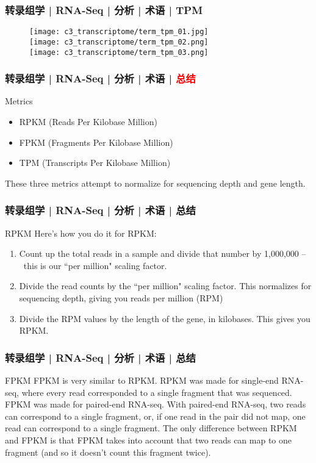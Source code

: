 \begin{frame}
  \frametitle{转录组学 | RNA-Seq | 分析 | 术语 | \alert{TPM}}
  \begin{figure}
    \centering
    \texttt{[image: c3\_transcriptome/term\_tpm\_01.jpg]}\\
    \texttt{[image: c3\_transcriptome/term\_tpm\_02.png]}\\
    \texttt{[image: c3\_transcriptome/term\_tpm\_03.png]}
  \end{figure}
\end{frame}

\begin{frame}
  \frametitle{转录组学 | RNA-Seq | 分析 | 术语 | \textcolor{red}{总结}}
  \begin{block}{Metrics}
    \begin{itemize}
      \item RPKM (Reads Per Kilobase Million)
      \item FPKM (Fragments Per Kilobase Million)
      \item TPM (Transcripts Per Kilobase Million)
    \end{itemize}
        These three metrics attempt to normalize for sequencing depth and gene length.
  \end{block}
\end{frame}

\begin{frame}
  \frametitle{转录组学 | RNA-Seq | 分析 | 术语 | 总结}
  \begin{block}{RPKM}
    Here's how you do it for RPKM:
    \begin{enumerate}
      \item Count up the total reads in a sample and divide that number by 1,000,000 –\ this is our ``per million" scaling factor.
      \item Divide the read counts by the ``per million" scaling factor. This normalizes for sequencing depth, giving you reads per million (RPM)
      \item Divide the RPM values by the length of the gene, in kilobases. This gives you RPKM.
    \end{enumerate}
  \end{block}
\end{frame}

\begin{frame}
  \frametitle{转录组学 | RNA-Seq | 分析 | 术语 | 总结}
  \begin{block}{FPKM}
 FPKM is very similar to RPKM. RPKM was made for single-end RNA-seq, where every read corresponded to a single fragment that was sequenced. FPKM was made for paired-end RNA-seq. With paired-end RNA-seq, two reads can correspond to a single fragment, or, if one read in the pair did not map, one read can correspond to a single fragment. The only difference between RPKM and FPKM is that FPKM takes into account that two reads can map to one fragment (and so it doesn't count this fragment twice).
  \end{block}
\end{frame}

